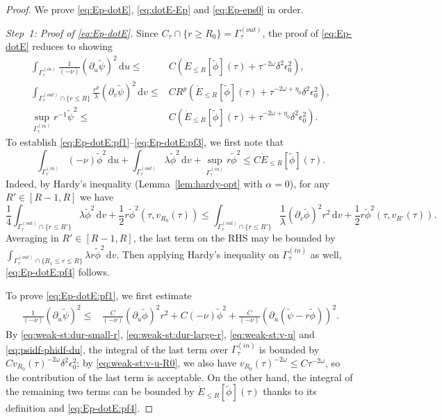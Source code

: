 \documentclass[10pt, reqno]{amsart}
\theoremstyle{definition}
\theoremstyle{remark}
\theoremstyle{conjecture}
\numberwithin{equation}{section}
\newcommand{\set}[1]{\{#1\}}
\newcommand{\ud}{\mathrm{d}}
\newcommand{\rd}{\partial}
\newcommand{\0}{\emptyset}
\newcommand{\alp}{\alpha}
\newcommand{\Gmm}{\Gamma}
\newcommand{\dlt}{\delta}
\newcommand{\eps}{\epsilon}
\newcommand{\lmb}{\lambda}
\newcommand{\omg}{\omega}
\newcommand{\dur}{\nu}
\newcommand{\dvr}{\lmb}
\newcommand{\pfstep}[1]{\vspace{.5em} {\it \noindent #1.}}
\newcommand{\phibg}{\overline{\phi}}				%
\newcommand{\psibg}{\overline{\psi}}				%
\newcommand{\phidf}{\widetilde{\phi}}				%
\newcommand{\psidf}{\widetilde{\psi}}				%
\begin{document}
\begin{proof}
We prove \eqref{eq:Ep-dotE}, \eqref{eq:dotE-Ep} and \eqref{eq:Ep-eps0} in order.

\pfstep{Step~1: Proof of \eqref{eq:Ep-dotE}}
Since $C_{\tau} \cap \set{r \geq R_{0}} = \Gmm^{(out)}_{\tau}$, the proof of \eqref{eq:Ep-dotE} reduces to showing
\begin{align} 
	\int_{\Gmm^{(in)}_{\tau}} \frac{1}{(-\dur)} (\rd_{u} \psidf)^{2} \, \ud u 
\leq & C \left( \dot{E}_{\leq R}[\phidf](\tau) + \tau^{-2 \omg} \dlt^{2} \eps_{0}^{2} \right), \label{eq:Ep-dotE:pf1} \\
	\int_{\Gmm^{(out)}_{\tau} \cap \set{r \leq R}} \frac{r^{p}}{\dvr} (\rd_{v} \psidf)^{2} \, \ud v
\leq & C R^{p} \left( \dot{E}_{\leq R}[\phidf](\tau) + \tau^{-2 \omg + \eta_{0}} \dlt^{2} \eps_{0}^{2} \right), \label{eq:Ep-dotE:pf2}  \\
	\sup_{\Gmm^{(in)}_{\tau}} r^{-1} \psidf^{2}
	\leq & C \left( \dot{E}_{\leq R}[\phidf](\tau) + \tau^{-2 \omg + \eta_{0}} \dlt^{2} \eps_{0}^{2} \right). \label{eq:Ep-dotE:pf3} 
\end{align}
To establish \eqref{eq:Ep-dotE:pf1}--\eqref{eq:Ep-dotE:pf3}, we first note that
\begin{equation} \label{eq:Ep-dotE:pf4} 
	\int_{\Gmm^{(in)}_{\tau}} (-\dur) \phidf^{2} \, \ud u 
	+ \int_{\Gmm^{(out)}_{\tau}} \dvr \phidf^{2} \, \ud v
	+ \sup_{\Gmm^{(in)}_{\tau}} r \phidf^{2}
	\leq C \dot{E}_{\leq R}[\phidf](\tau).
\end{equation}
Indeed, by Hardy's inequality (Lemma~\ref{lem:hardy-opt} with $\alp = 0$), for any $R' \in [R-1, R]$ we have
\begin{equation*}
\frac{1}{4} \int_{\Gmm^{(out)}_{\tau} \cap \set{r \leq R'}} \dvr \phidf^{2} \, \ud v + \frac{1}{2} r \phidf^{2}(\tau, v_{R_{0}}(\tau))
\leq \int_{\Gmm^{(out)}_{\tau} \cap \set{r \leq R'}} \frac{1}{\dvr} (\rd_{v} \phidf)^{2} r^{2} \, \ud v + \frac{1}{2} r \phidf^{2}(\tau, v_{R'}(\tau)).
\end{equation*}
Averaging in $R' \in [R-1, R]$, the last term on the RHS may be bounded by $\int_{\Gmm_{\tau}^{(out)} \cap \set{R_{1} \leq r \leq R}} \dvr r \phidf^{2} \, \ud v$. Then applying Hardy's inequality on $\Gmm^{(in)}_{\tau}$ as well, \eqref{eq:Ep-dotE:pf4} follows.

To prove \eqref{eq:Ep-dotE:pf1}, we first estimate
\begin{align*}
	\frac{1}{(-\dur)}(\rd_{u} \psidf)^{2} 
	\leq & \frac{C}{(-\dur)} (\rd_{u} \phidf)^{2} r^{2} + C (-\dur) \phidf^{2} +  \frac{C}{(-\dur)} (\rd_{u} (\psidf - r \phidf))^{2}  .
\end{align*}
By \eqref{eq:weak-st:dur-small-r}, \eqref{eq:weak-st:dur-large-r}, \eqref{eq:weak-st:v-u} and \eqref{eq:psidf-phidf-du}, the integral of the last term over $\Gmm^{(in)}_{\tau}$ is bounded by $C v_{R_{0}}(\tau)^{-2 \omg} \dlt^{2} \eps_{0}^{2}$; by \eqref{eq:weak-st:v-u-R0}, we also have $v_{R_{0}}(\tau)^{- 2\omg} \leq C \tau^{-2 \omg}$, so the contribution of the last term is acceptable. On the other hand, the integral of the remaining two terms can be bounded by $\dot{E}_{\leq R}[\phidf](\tau)$ thanks to its definition and \eqref{eq:Ep-dotE:pf4}.


\end{proof}
\end{document}

